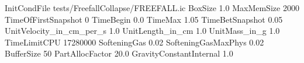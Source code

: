 InitCondFile    tests/FreefallCollapse/FREEFALL.ic
BoxSize    1.0
MaxMemSize    2000
TimeOfFirstSnapshot    0
TimeBegin    0.0
TimeMax    1.05
TimeBetSnapshot    0.05
UnitVelocity_in_cm_per_s    1.0
UnitLength_in_cm    1.0
UnitMass_in_g    1.0
TimeLimitCPU    17280000
SofteningGas    0.02
SofteningGasMaxPhys    0.02
BufferSize    50
PartAllocFactor    20.0
GravityConstantInternal    1.0
